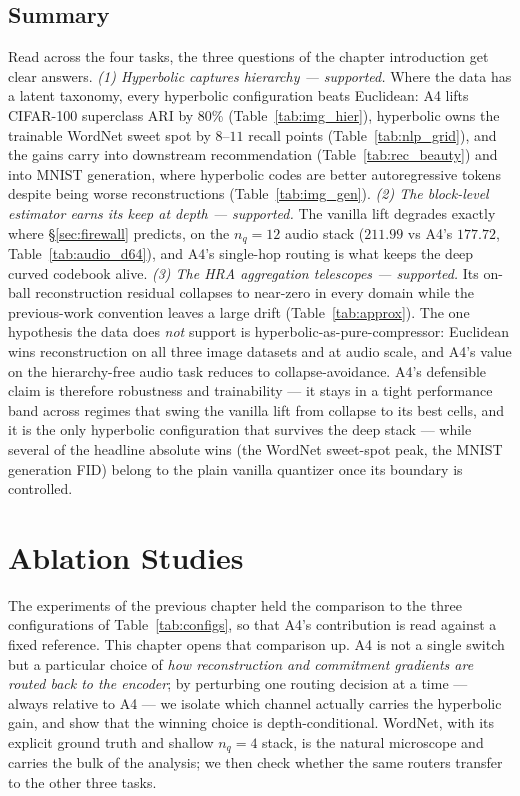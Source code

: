 \documentclass[12pt]{report}
\begin{document}
\section{Summary}
\label{sec:exp_summary}

Read across the four tasks, the three questions of the chapter introduction get clear answers. \emph{(1) Hyperbolic captures hierarchy --- supported.} Where the data has a latent taxonomy, every hyperbolic configuration beats Euclidean: A4 lifts CIFAR-100 superclass ARI by $80\%$ (Table~\ref{tab:img_hier}), hyperbolic owns the trainable WordNet sweet spot by $8$--$11$ recall points (Table~\ref{tab:nlp_grid}), and the gains carry into downstream recommendation (Table~\ref{tab:rec_beauty}) and into MNIST generation, where hyperbolic codes are better autoregressive tokens despite being worse reconstructions (Table~\ref{tab:img_gen}). \emph{(2) The block-level estimator earns its keep at depth --- supported.} The vanilla lift degrades exactly where \S\ref{sec:firewall} predicts, on the $n_q=12$ audio stack ($211.99$ vs A4's $177.72$, Table~\ref{tab:audio_d64}), and A4's single-hop routing is what keeps the deep curved codebook alive. \emph{(3) The HRA aggregation telescopes --- supported.} Its on-ball reconstruction residual collapses to near-zero in every domain while the previous-work convention leaves a large drift (Table~\ref{tab:approx}). The one hypothesis the data does \emph{not} support is hyperbolic-as-pure-compressor: Euclidean wins reconstruction on all three image datasets and at audio scale, and A4's value on the hierarchy-free audio task reduces to collapse-avoidance. A4's defensible claim is therefore robustness and trainability --- it stays in a tight performance band across regimes that swing the vanilla lift from collapse to its best cells, and it is the only hyperbolic configuration that survives the deep stack --- while several of the headline absolute wins (the WordNet sweet-spot peak, the MNIST generation FID) belong to the plain vanilla quantizer once its boundary is controlled.

\chapter{Ablation Studies}
\label{ch:ablation}

The experiments of the previous chapter held the comparison to the three configurations of Table~\ref{tab:configs}, so that A4's contribution is read against a fixed reference. This chapter opens that comparison up. A4 is not a single switch but a particular choice of \emph{how reconstruction and commitment gradients are routed back to the encoder}; by perturbing one routing decision at a time --- always relative to A4 --- we isolate which channel actually carries the hyperbolic gain, and show that the winning choice is depth-conditional. WordNet, with its explicit ground truth and shallow $n_q=4$ stack, is the natural microscope and carries the bulk of the analysis; we then check whether the same routers transfer to the other three tasks.
\end{document}
